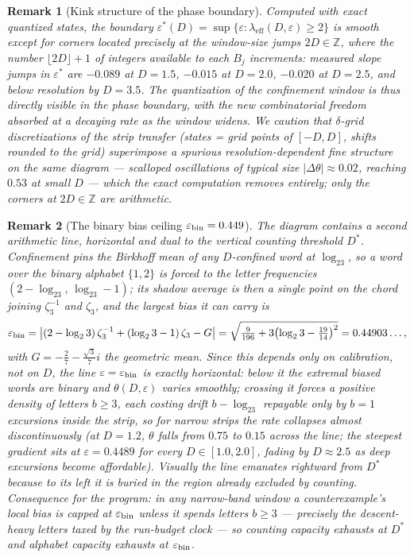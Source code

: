 \documentclass[11pt]{article}
\newtheorem*{remark}{Remark}
\begin{document}
\begin{remark}[Kink structure of the phase boundary]
Computed with exact quantized states, the boundary
$\varepsilon^*(D)=\sup\{\varepsilon:\lambda_{\mathrm{eff}}(D,\varepsilon)\ge2\}$
is smooth except for corners located precisely at the
\emph{window-size jumps} $2D\in\mathbb Z$, where the number
$\lfloor2D\rfloor+1$ of integers available to each $B_j$ increments:
measured slope jumps in $\varepsilon^*$ are $-0.089$ at $D=1.5$,
$-0.015$ at $D=2.0$, $-0.020$ at $D=2.5$, and below resolution by
$D=3.5$. The quantization of the confinement window is thus directly
visible in the phase boundary, with the new combinatorial freedom
absorbed at a decaying rate as the window widens. We caution that
$\delta$-grid discretizations of the strip transfer (states = grid
points of $[-D,D]$, shifts rounded to the grid) superimpose a spurious
resolution-dependent fine structure on the same diagram --- scalloped
oscillations of typical size $|\Delta\theta|\approx0.02$, reaching
$0.53$ at small $D$ --- which the exact computation removes entirely;
only the corners at $2D\in\mathbb Z$ are arithmetic.
\end{remark}

\begin{remark}[The binary bias ceiling $\varepsilon_{\rm bin}=0.449$]
The diagram contains a second arithmetic line, horizontal and dual to
the vertical counting threshold $D^*$. Confinement pins the Birkhoff
mean of any $D$-confined word at $\log_23$, so a word over the binary
alphabet $\{1,2\}$ is forced to the letter frequencies
$(2-\log_23,\,\log_23-1)$; its shadow average is then a single point on
the chord joining $\zeta_3^{-1}$ and $\zeta_3$, and the largest bias it
can carry is
\[
\varepsilon_{\rm bin}
=\bigl|(2-\log_23)\,\zeta_3^{-1}+(\log_23-1)\,\zeta_3-G\bigr|
=\sqrt{\tfrac{9}{196}+3\bigl(\log_23-\tfrac{19}{14}\bigr)^2}
=0.44903\ldots,
\]
with $G=-\tfrac27-\tfrac{\sqrt3}{7}i$ the geometric mean. Since this
depends only on calibration, not on $D$, the line
$\varepsilon=\varepsilon_{\rm bin}$ is exactly horizontal: below it the
extremal biased words are binary and $\theta(D,\varepsilon)$ varies
smoothly; crossing it forces a positive density of letters $b\ge3$,
each costing drift $b-\log_23$ repayable only by $b{=}1$ excursions
inside the strip, so for narrow strips the rate collapses almost
discontinuously (at $D=1.2$, $\theta$ falls from $0.75$ to $0.15$
across the line; the steepest gradient sits at $\varepsilon=0.4489$ for
every $D\in[1.0,2.0]$, fading by $D\approx2.5$ as deep excursions
become affordable). Visually the line emanates rightward from $D^*$
because to its left it is buried in the region already excluded by
counting. Consequence for the program: in any narrow-band window a
counterexample's local bias is capped at $\varepsilon_{\rm bin}$ unless
it spends letters $b\ge3$ --- precisely the descent-heavy letters taxed
by the run-budget clock --- so counting capacity exhausts at $D^*$ and
alphabet capacity exhausts at $\varepsilon_{\rm bin}$.
\end{remark}
\end{document}
